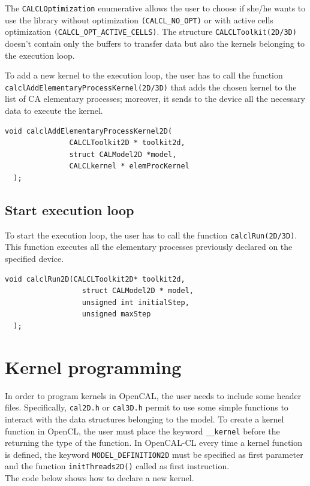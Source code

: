 The \verb'CALCLOptimization' enumerative allows the user to choose if
she/he wants to use the library without optimization
\verb|(CALCL_NO_OPT)| or with active cells optimization
\verb|(CALCL_OPT_ACTIVE_CELLS)|. The structure
\verb'CALCLToolkit(2D/3D)' doesn't contain only the buffers to
transfer data but also the kernels belonging to the execution
loop.

To add a new kernel to the execution loop, the user has to
call the function \verb'calclAddElementaryProcessKernel(2D/3D)' that
adds the chosen kernel to the list of CA elementary processes;
moreover, it sends to the device all the necessary data to execute the
kernel.

\begin{lstlisting}[numbers=none]
  void calclAddElementaryProcessKernel2D(
               CALCLToolkit2D * toolkit2d,
               struct CALModel2D *model,
               CALCLkernel * elemProcKernel
  );
\end{lstlisting}


\subsection{Start execution loop}

To start the execution loop, the user has to call the function
\verb'calclRun(2D/3D)'. This function executes all the elementary
processes previously declared on the specified device.

\begin{lstlisting}[numbers=none]
  void calclRun2D(CALCLToolkit2D* toolkit2d,
                  struct CALModel2D * model,
                  unsigned int initialStep,
                  unsigned maxStep
  );
\end{lstlisting}


\section{Kernel programming}

In order to program kernels in OpenCAL, the user needs to include some
header files. Specifically, \verb'cal2D.h' or \verb'cal3D.h' permit
to use some simple functions to interact with the data structures
belonging to the model. To create a kernel function in OpenCL, the user
must place the keyword \verb'__kernel' before the returning the type
of the function. In OpenCAL-CL every time a kernel function is defined, the
keyword \verb'MODEL_DEFINITION2D' must be specified as first parameter
and the function \verb'initThreads2D()' called as first
instruction.\\ The code below shows how to declare a new kernel.

